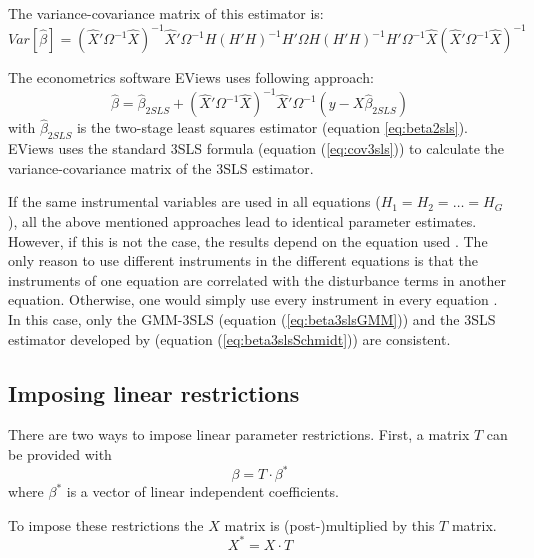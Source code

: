 \documentclass[article]{jss}
\begin{document}
The variance-covariance matrix of this estimator is:
\begin{equation}
   Var \left[ \widehat{\beta} \right] = 
   \left( \widehat{X}' \Omega^{-1}  \widehat{X} \right)^{-1} 
   \widehat{X}' \Omega^{-1} H \left( H' H \right)^{-1} H' \Omega 
   H \left( H' H \right)^{-1} H' \Omega^{-1} \widehat{X}
   \left( \widehat{X}' \Omega^{-1}  \widehat{X} \right)^{-1}
\end{equation}


The econometrics software EViews uses following approach:
\begin{equation}
   \widehat{\beta} = \widehat{\beta}_{2SLS} + 
   \left( \widehat{X}' \Omega^{-1} \widehat{X} \right)^{-1} 
   \widehat{X}' \Omega^{-1} \left( y - X \widehat{\beta}_{2SLS} \right)
\end{equation}
with $\widehat{\beta}_{2SLS}$ is the two-stage least squares estimator
(equation \ref{eq:beta2sls}).
EViews uses the standard 3SLS formula (equation (\ref{eq:cov3sls})) to 
calculate the variance-covariance matrix of the 3SLS estimator.


If the same instrumental variables are used in all equations 
($H_1 = H_2 = \ldots = H_G$), 
all the above mentioned approaches lead to identical parameter estimates.
However, if this is not the case, the results depend on the 
equation used \citep{schmidt90}. 
The only reason to use different instruments in the different equations 
is that the instruments of one equation are correlated with the
disturbance terms in another equation. Otherwise, one would simply use
every instrument in every equation \citep{schmidt90}. 
In this case, only the GMM-3SLS (equation (\ref{eq:beta3slsGMM}))
and the 3SLS estimator developed by \cite{schmidt90} 
(equation (\ref{eq:beta3slsSchmidt})) are consistent.





\subsection{Imposing linear restrictions}
There are two ways to impose linear parameter restrictions.
First, a matrix $T$ can be provided with
\begin{equation}
   \beta = T \cdot \beta^* \label{eq:T-restr} 
\end{equation}
where $\beta^*$ is a vector of linear independent coefficients.

To impose these restrictions the $X$ matrix is
(post-)multiplied by this $T$ matrix.
\begin{equation}
    X^* = X \cdot T
\end{equation}
\end{document}
